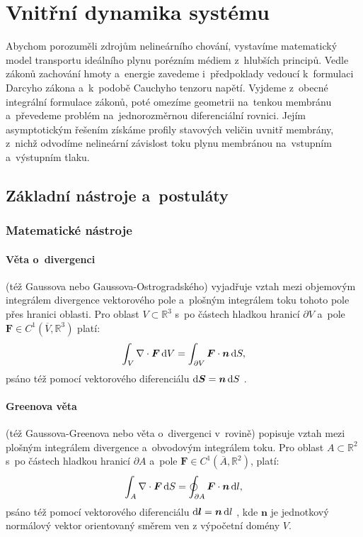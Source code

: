 \section{Vnitřní dynamika systému}\label{s:vnitrni_dynamika_systemu}
Abychom porozuměli zdrojům nelineárního chování, vystavíme matematický model transportu ideálního plynu porézním médiem z~hlubších principů. Vedle zákonů zachování hmoty a~energie zavedeme i~předpoklady vedoucí k~formulaci Darcyho zákona a~k~podobě Cauchyho tenzoru napětí. Vyjdeme z~obecné integrální formulace zákonů, poté omezíme geometrii na~tenkou membránu a~převedeme problém na~jednorozměrnou diferenciální rovnici. Jejím asymptotickým řešením získáme profily stavových veličin uvnitř membrány, z~nichž odvodíme nelineární závislost toku plynu membránou na~vstupním a~výstupním tlaku.

\subsection{Základní nástroje a~postuláty}\label{ss:zakladni_nastroje_a_postulaty}
\subsubsection{Matematické nástroje}\label{sss:matematicke_nastroje}
\paragraph{Věta o~divergenci} (též Gaussova nebo Gaussova-Ostrogradského) vyjadřuje vztah mezi objemovým integrálem divergence vektorového pole a~plošným integrálem toku tohoto pole přes hranici oblasti. Pro oblast $V\subset\mathbb{R}^3$ s~po částech hladkou hranicí $\partial V$ a~pole $\bm{F}\in C^1 (\overline{V}, \mathbb{R}^3)$ platí:
\begin{equation}\label{eq:divergence_theorem}
    \int_{V}\nabla\cdot\bm{F}\,\mathrm{d}{V}=\int_{\partial V} \bm{F}\cdot \bm{n} \,\mathrm{d}{S},
\end{equation}
psáno též pomocí vektorového diferenciálu $\mathrm{d}\bm{S}=\bm{n}\,\mathrm{d}{S}$ \cite{marsden2003}.

\paragraph{Greenova věta} (též Gaussova-Greenova nebo věta o~divergenci v~rovině) popisuje vztah mezi plošným integrálem divergence a~obvodovým integrálem toku. Pro oblast $A\subset\mathbb{R}^2$ s~po částech hladkou hranicí $\partial A$ a~pole $\bm{F}\in C^1(\overline{A},\mathbb{R}^2)$, platí:
\begin{equation}\label{eq:green_standard}
    \int_{A}\nabla\cdot\bm{F}\,\mathrm{d}{S}=\oint_{\partial A} \bm{F}\cdot \bm{n} \,\mathrm{d}{l},
\end{equation}
psáno též pomocí vektorového diferenciálu $\mathrm{d}\bm{l}=\bm{n}\,\mathrm{d}{l}$ \cite{marsden2003}, kde $\bm{n}$ je jednotkový normálový vektor orientovaný směrem ven z výpočetní domény $V$. 

